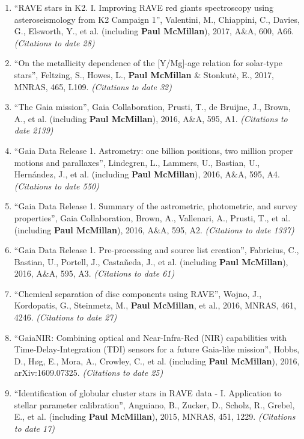 \documentclass{resume}
\begin{document}
\begin{enumerate}
\item ``RAVE stars in K2. I. Improving RAVE red giants spectroscopy using asteroseismology from K2 Campaign 1'', Valentini, M., Chiappini, C., Davies, G., Elsworth, Y., et al. (including \textbf{Paul McMillan}), 2017, A\&A, 600, A66. \textit{(Citations to date 28)}

\item ``On the metallicity dependence of the [Y/Mg]-age relation for solar-type stars'', Feltzing, S., Howes, L., \textbf{Paul McMillan} \& Stonkut\.{e}, E., 2017, MNRAS, 465, L109. \textit{(Citations to date 32)}

\item ``The Gaia mission'', Gaia Collaboration, Prusti, T., de Bruijne, J., Brown, A., et al. (including \textbf{Paul McMillan}), 2016, A\&A, 595, A1. \textit{(Citations to date 2139)}

\item ``Gaia Data Release 1. Astrometry: one billion positions, two million proper motions and parallaxes'', Lindegren, L., Lammers, U., Bastian, U., Hern\'andez, J., et al. (including \textbf{Paul McMillan}), 2016, A\&A, 595, A4. \textit{(Citations to date 550)}

\item ``Gaia Data Release 1. Summary of the astrometric, photometric, and survey properties'', Gaia Collaboration, Brown, A., Vallenari, A., Prusti, T., et al. (including \textbf{Paul McMillan}), 2016, A\&A, 595, A2. \textit{(Citations to date 1337)}

\item ``Gaia Data Release 1. Pre-processing and source list creation'', Fabricius, C., Bastian, U., Portell, J., Casta\~neda, J., et al. (including \textbf{Paul McMillan}), 2016, A\&A, 595, A3. \textit{(Citations to date 61)}

\item ``Chemical separation of disc components using RAVE'', Wojno, J., Kordopatis, G., Steinmetz, M., \textbf{Paul McMillan}, et al., 2016, MNRAS, 461, 4246. \textit{(Citations to date 27)}

\item ``GaiaNIR: Combining optical and Near-Infra-Red (NIR) capabilities with Time-Delay-Integration (TDI) sensors for a future Gaia-like mission'', Hobbs, D., H{\o}g, E., Mora, A., Crowley, C., et al. (including \textbf{Paul McMillan}), 2016, arXiv:1609.07325. \textit{(Citations to date 25)}

\item ``Identification of globular cluster stars in RAVE data - I. Application to stellar parameter calibration'', Anguiano, B., Zucker, D., Scholz, R., Grebel, E., et al. (including \textbf{Paul McMillan}), 2015, MNRAS, 451, 1229. \textit{(Citations to date 17)}


\end{enumerate}
\end{document}
